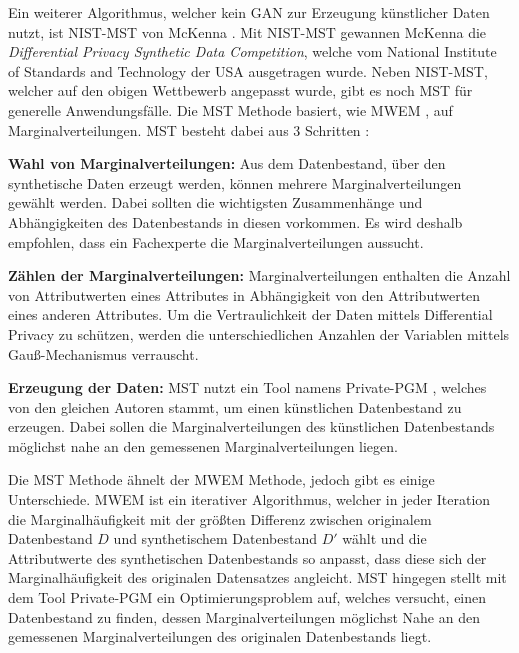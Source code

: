 Ein weiterer Algorithmus, welcher kein GAN zur Erzeugung künstlicher Daten nutzt, ist NIST-MST von McKenna \etal \cite{P-95}.
Mit NIST-MST gewannen McKenna \etal die \textit{Differential Privacy Synthetic Data Competition}, welche vom National Institute of Standards and Technology der USA ausgetragen wurde.
Neben NIST-MST, welcher auf den obigen Wettbewerb angepasst wurde, gibt es noch MST für generelle Anwendungsfälle.
Die MST Methode basiert, wie MWEM \cite{P-90}, auf Marginalverteilungen.
MST besteht dabei aus 3 Schritten \cite{P-95}:
\begin{compactenum}
    \item \textbf{Wahl von Marginalverteilungen:} Aus dem Datenbestand, über den synthetische Daten erzeugt werden, können mehrere Marginalverteilungen gewählt werden. Dabei sollten die wichtigsten Zusammenhänge und Abhängigkeiten des Datenbestands in diesen vorkommen. Es wird deshalb empfohlen, dass ein Fachexperte die Marginalverteilungen aussucht.
    \item \textbf{Zählen der Marginalverteilungen:} Marginalverteilungen enthalten die Anzahl von Attributwerten eines Attributes in Abhängigkeit von den Attributwerten eines anderen Attributes. Um die Vertraulichkeit der Daten mittels Differential Privacy zu schützen, werden die unterschiedlichen Anzahlen der Variablen mittels Gauß-Mechanismus verrauscht.
    \item \textbf{Erzeugung der Daten:} MST nutzt ein Tool namens Private-PGM \cite{P-97}, welches von den gleichen Autoren stammt, um einen künstlichen Datenbestand zu erzeugen. Dabei sollen die Marginalverteilungen des künstlichen Datenbestands möglichst nahe an den gemessenen Marginalverteilungen liegen.
\end{compactenum}
Die MST Methode ähnelt der MWEM Methode, jedoch gibt es einige Unterschiede.
MWEM ist ein iterativer Algorithmus, welcher in jeder Iteration die Marginalhäufigkeit mit der größten Differenz zwischen originalem Datenbestand $D$ und synthetischem Datenbestand $D'$ wählt und die Attributwerte des synthetischen Datenbestands so anpasst, dass diese sich der Marginalhäufigkeit des originalen Datensatzes angleicht.
MST hingegen stellt mit dem Tool Private-PGM \cite{P-97} ein Optimierungsproblem auf, welches versucht, einen Datenbestand zu finden, dessen Marginalverteilungen möglichst Nahe an den gemessenen Marginalverteilungen des originalen Datenbestands liegt.